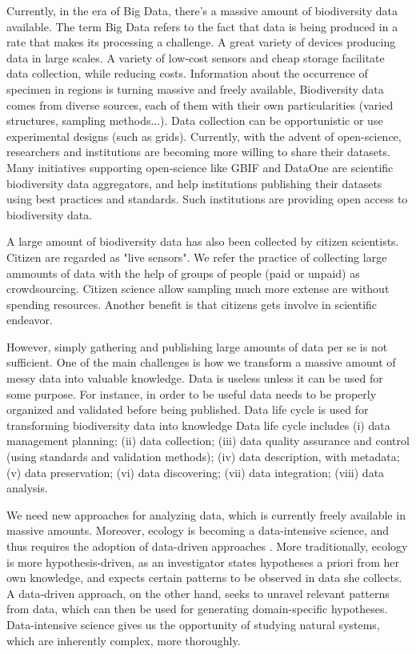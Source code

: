 Currently, in the era of Big Data, there's a massive amount of biodiversity data available. 
The term Big Data refers to the fact that data is being produced in a rate that makes its processing a challenge.
A great variety of devices producing data in large scales.
A variety of low-cost sensors and cheap storage facilitate data collection, while reducing costs.
Information about the occurrence of specimen in regions is turning massive and freely available,
Biodiversity data comes from diverse sources, each of them with their own particularities (varied structures, sampling methods...).
Data collection can be opportunistic or use experimental designs (such as grids).
Currently, with the advent of open-science, researchers and institutions are becoming more willing to share their datasets. 
Many initiatives supporting open-science like GBIF \cite{gbif} and DataOne are scientific biodiversity data aggregators, and help institutions publishing their datasets using best practices and standards.
Such institutions are providing open access to biodiversity data.


A large amount of biodiversity data has also been collected by citizen scientists. 
Citizen are regarded as "live sensors".
We refer the practice of collecting large ammounts of data with the help of groups of people (paid or unpaid) as crowdsourcing.
Citizen science allow sampling much more extense are without spending resources.
Another benefit is that citizens gets involve in scientific endeavor.


However, simply gathering and publishing large amounts of data per se is not sufficient.
One of the main challenges is how we transform a massive amount of messy data into valuable knowledge.
Data is useless unless it can be used for some purpose.
For instance, in order to be useful data needs to be properly organized and validated before being published.
Data life cycle is used for transforming biodiversity data into knowledge \cite{Michener2012}
Data life cycle includes (i) data management planning; (ii) data collection; (iii) data quality assurance and control (using standards and validation methods); (iv) data description, with metadata; (v) data preservation; (vi) data discovering; (vii) data integration; (viii) data analysis. 


We need new approaches for analyzing data, which is currently freely available in massive amounts.
Moreover, ecology is becoming a data-intensive science, and thus requires the adoption of data-driven approaches \cite{Kelling2009}.
More traditionally, ecology is more hypothesis-driven, as an investigator states hypotheses a priori from her own knowledge, and expects certain patterns to be observed in data she collects.
A data-driven approach, on the other hand, seeks to unravel relevant patterns from data, which can then be used for generating domain-specific hypotheses.
Data-intensive science gives us the opportunity of studying natural systems, which are inherently complex, more thoroughly.


